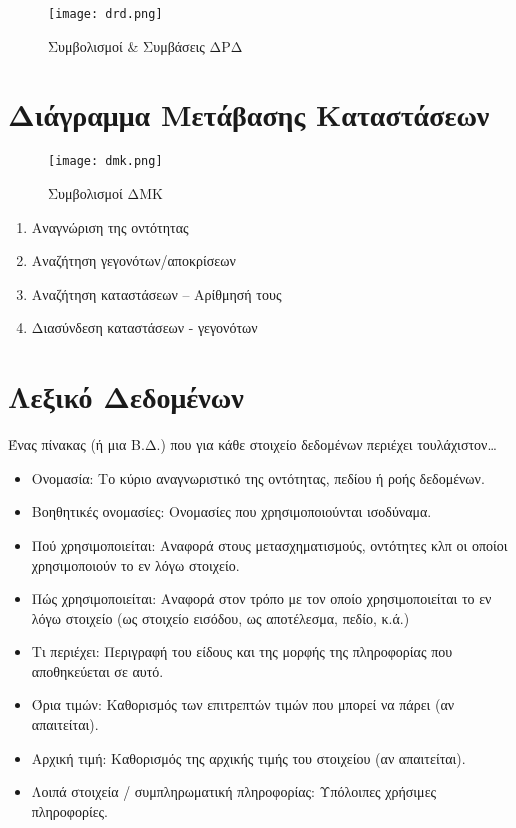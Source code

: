 \begin{figure}[H]
	\centering
	\texttt{[image: drd.png]}
	\caption{Συμβολισμοί \& Συμβάσεις ΔΡΔ}
\end{figure}


\section{Διάγραμμα Μετάβασης Καταστάσεων}

\begin{figure}[H]
	\centering
	\texttt{[image: dmk.png]}
	\caption{Συμβολισμοί ΔΜΚ}
\end{figure}

\begin{enumerate}
	\item	Αναγνώριση της οντότητας
	\item	Αναζήτηση γεγονότων/αποκρίσεων
	\item	Αναζήτηση καταστάσεων – Αρίθμησή τους
	\item	Διασύνδεση καταστάσεων - γεγονότων
\end{enumerate}

\section{Λεξικό Δεδομένων}

Ένας πίνακας (ή μια Β.Δ.) που για κάθε στοιχείο δεδομένων περιέχει τουλάχιστον…

\begin{itemize}
	\item	Ονομασία: Το κύριο αναγνωριστικό της οντότητας, πεδίου ή ροής δεδομένων.
	\item	Βοηθητικές ονομασίες: Ονομασίες που χρησιμοποιούνται ισοδύναμα.
	\item	Πού χρησιμοποιείται: Αναφορά στους μετασχηματισμούς, οντότητες κλπ 
		οι οποίοι χρησιμοποιούν το εν λόγω στοιχείο.
	\item	Πώς χρησιμοποιείται: Αναφορά στον τρόπο με τον οποίο χρησιμοποιείται το εν λόγω στοιχείο
		(ως στοιχείο εισόδου, ως αποτέλεσμα, πεδίο, κ.ά.)
	\item	Τι περιέχει: Περιγραφή του είδους και της μορφής της πληροφορίας που αποθηκεύεται σε αυτό.
	\item	Όρια τιμών: Καθορισμός των επιτρεπτών τιμών που μπορεί να πάρει (αν απαιτείται).
	\item	Αρχική τιμή: Καθορισμός της αρχικής τιμής του στοιχείου (αν απαιτείται).
	\item	Λοιπά στοιχεία / συμπληρωματική πληροφορίας: Υπόλοιπες χρήσιμες πληροφορίες.
\end{itemize}
